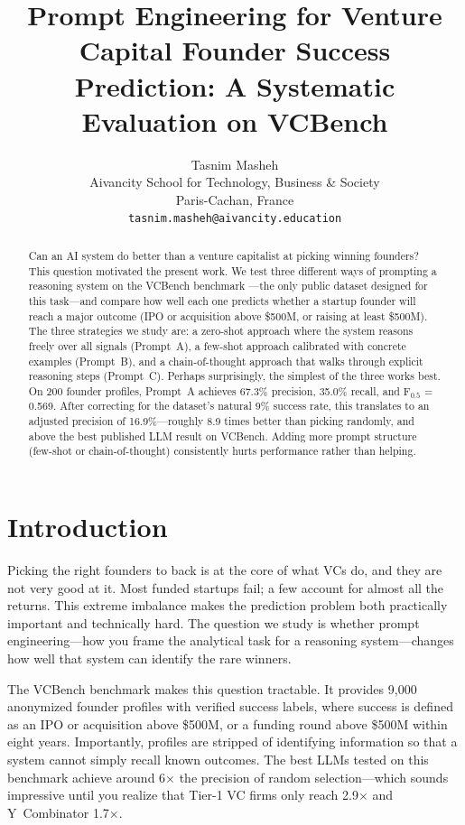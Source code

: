 \documentclass{article}
\title{Prompt Engineering for Venture Capital Founder Success\\
Prediction: A Systematic Evaluation on VCBench}
\author{
  Tasnim Masheh\\
  Aivancity School for Technology, Business \& Society\\
  Paris-Cachan, France\\
  \texttt{tasnim.masheh@aivancity.education}
}
\begin{document}
\maketitle

\begin{abstract}
Can an AI system do better than a venture capitalist at picking winning founders? This question motivated the present work. We test three different ways of prompting a reasoning system on the VCBench benchmark \cite{chen2025vcbench}---the only public dataset designed for this task---and compare how well each one predicts whether a startup founder will reach a major outcome (IPO or acquisition above \$500M, or raising at least \$500M). The three strategies we study are: a zero-shot approach where the system reasons freely over all signals (Prompt~A), a few-shot approach calibrated with concrete examples (Prompt~B), and a chain-of-thought approach that walks through explicit reasoning steps (Prompt~C). Perhaps surprisingly, the simplest of the three works best. On 200 founder profiles, Prompt~A achieves 67.3\% precision, 35.0\% recall, and F$_{0.5}$ = 0.569. After correcting for the dataset's natural 9\% success rate, this translates to an adjusted precision of 16.9\%---roughly 8.9 times better than picking randomly, and above the best published LLM result on VCBench. Adding more prompt structure (few-shot or chain-of-thought) consistently hurts performance rather than helping.
\end{abstract}

\section{Introduction}

Picking the right founders to back is at the core of what VCs do, and they are not very good at it. Most funded startups fail; a few account for almost all the returns. This extreme imbalance makes the prediction problem both practically important and technically hard. The question we study is whether prompt engineering---how you frame the analytical task for a reasoning system---changes how well that system can identify the rare winners.

The VCBench benchmark \cite{chen2025vcbench} makes this question tractable. It provides 9,000 anonymized founder profiles with verified success labels, where success is defined as an IPO or acquisition above \$500M, or a funding round above \$500M within eight years. Importantly, profiles are stripped of identifying information so that a system cannot simply recall known outcomes. The best LLMs tested on this benchmark achieve around 6$\times$ the precision of random selection---which sounds impressive until you realize that Tier-1 VC firms only reach 2.9$\times$ and Y~Combinator 1.7$\times$.
\end{document}
